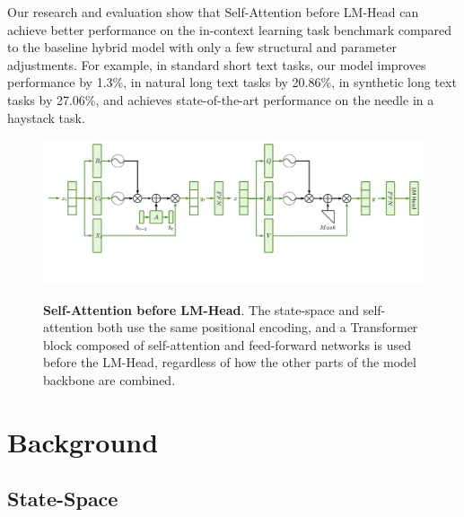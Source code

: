 \documentclass{article}
\theoremstyle{plain}
\theoremstyle{definition}
\theoremstyle{remark}
\begin{document}
Our research and evaluation show that Self-Attention before LM-Head can achieve better performance on the in-context learning task benchmark compared to the baseline hybrid model with only a few structural and parameter adjustments. For example, in standard short text tasks, our model improves performance by 1.3\%, in natural long text tasks by 20.86\%, in synthetic long text tasks by 27.06\%, and achieves state-of-the-art performance on the needle in a haystack task.

\begin{figure}[ht]
   \centering
   \includegraphics[width=\linewidth]{fig/architecture.pdf}
   \caption{
     \textbf{Self-Attention before LM-Head}.
      The state-space and self-attention both use the same positional encoding, and a Transformer block composed of self-attention and feed-forward networks is used before the LM-Head, regardless of how the other parts of the model backbone are combined.
      }
      \textbf{}


   \label{fig:architecture}
\end{figure}


\section{Background}
\subsection{State-Space}
\end{document}
